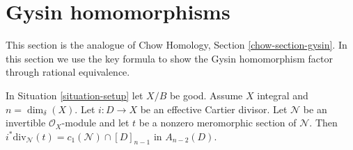\section{Gysin homomorphisms}
\label{section-gysin}

\noindent
This section is the analogue of
Chow Homology, Section \ref{chow-section-gysin}.
In this section we use the key formula to show the Gysin homomorphism
factor through rational equivalence.

\begin{lemma}
\label{lemma-gysin-factors-general}
In Situation \ref{situation-setup} let $X/B$ be good.
Assume $X$ integral and $n = \dim_\delta(X)$.
Let $i : D \to X$ be an effective Cartier divisor.
Let $\mathcal{N}$ be an invertible $\mathcal{O}_X$-module
and let $t$ be a nonzero meromorphic section of $\mathcal{N}$.
Then $i^*\text{div}_\mathcal{N}(t) = c_1(\mathcal{N}) \cap [D]_{n - 1}$
in $A_{n - 2}(D)$.
\end{lemma}

